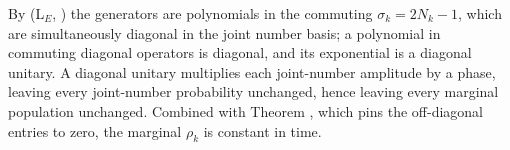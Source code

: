 By (L$_E$, ) the generators are polynomials in the commuting $\sigma_k = 2N_k - 1$, which are simultaneously diagonal in the joint number basis; a polynomial in commuting diagonal operators is diagonal, and its exponential is a diagonal unitary. A diagonal unitary multiplies each joint-number amplitude by a phase, leaving every joint-number probability unchanged, hence leaving every marginal population unchanged. Combined with Theorem , which pins the off-diagonal entries to zero, the marginal $\rho_k$ is constant in time.
